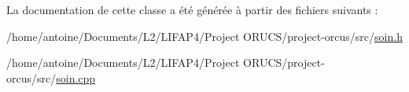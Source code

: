 La documentation de cette classe a été générée à partir des fichiers suivants \+:\begin{DoxyCompactItemize}
\item 
/home/antoine/\+Documents/\+L2/\+L\+I\+F\+A\+P4/\+Project O\+R\+U\+C\+S/project-\/orcus/src/\hyperlink{soin_8h}{soin.\+h}\item 
/home/antoine/\+Documents/\+L2/\+L\+I\+F\+A\+P4/\+Project O\+R\+U\+C\+S/project-\/orcus/src/\hyperlink{soin_8cpp}{soin.\+cpp}\end{DoxyCompactItemize}
